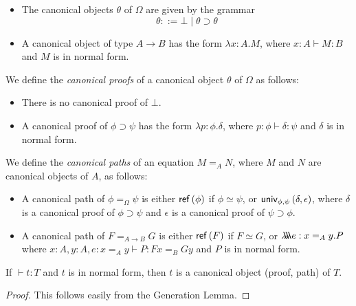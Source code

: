 \begin{definition}
$ $
\begin{itemize}
\item
The canonical objects $\theta$ of $\Omega$ are given by the grammar
\[ \theta ::= \bot \mid \theta \supset \theta \]
\item
A canonical object of type $A \rightarrow B$ has the form $\lambda x:A.M$, where
$x : A \vdash M : B$ and $M$ is in normal form.
\end{itemize}
We define the \emph{canonical proofs} of a canonical object $\theta$ of $\Omega$ as follows:
\begin{itemize}
\item
There is no canonical proof of $\bot$.
\item
A canonical proof of $\phi \supset \psi$ has the form $\lambda p : \phi . \delta$, where $p : \phi \vdash \delta : \psi$ and $\delta$ is in normal form.
\end{itemize}
We define the \emph{canonical paths} of an equation $M =_A N$, where $M$ and $N$ are canonical objects of $A$, as follows:
\begin{itemize}
\item
A canonical path of $\phi =_\Omega \psi$ is either $\mathsf{ref} \left( {\phi} \right)$ if $\phi \simeq \psi$, or $\mathsf{univ}_{{\phi} , {\psi}} \left( {\delta} , {\epsilon} \right)$, where $\delta$ is a canonical
proof of $\phi \supset \psi$ and $\epsilon$ is a canonical proof of $\psi \supset \phi$.
\item
A canonical path of $F =_{A \rightarrow B} G$ is either $\mathsf{ref} \left( {F} \right)$ if $F \simeq G$, or $\lambda \!\! \lambda \!\! \lambda e:x =_A y.P$ where $x : A, y : A, e : x =_A y \vdash P : Fx =_B Gy$ and $P$ is in normal form.
\end{itemize}
\end{definition}

\begin{prop}[Canonicity]
If $\vdash t : T$ and $t$ is in normal form, then $t$ is a canonical object (proof, path) of $T$.
\end{prop}

\begin{proof}
This follows easily from the Generation Lemma.
\end{proof}